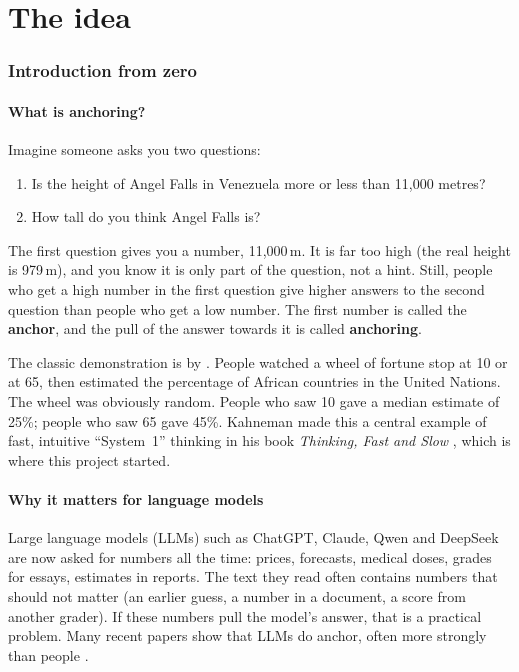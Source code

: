 \documentclass[11pt,a4paper]{article}
\begin{document}
\tableofcontents
\clearpage

\part{The idea}

\section{Introduction from zero}
\label{sec:intro}

\subsection{What is anchoring?}

Imagine someone asks you two questions:
\begin{enumerate}
  \item Is the height of Angel Falls in Venezuela more or less than 11,000 metres?
  \item How tall do you think Angel Falls is?
\end{enumerate}
The first question gives you a number, 11,000\,m. It is far too high (the real height is 979\,m), and you know it is only part of the question, not a hint. Still, people who get a high number in the first question give higher answers to the second question than people who get a low number. The first number is called the \textbf{anchor}, and the pull of the answer towards it is called \textbf{anchoring}.

The classic demonstration is by \citet{tversky1974judgment}. People watched a wheel of fortune stop at 10 or at 65, then estimated the percentage of African countries in the United Nations. The wheel was obviously random. People who saw 10 gave a median estimate of 25\%; people who saw 65 gave 45\%. Kahneman made this a central example of fast, intuitive ``System~1'' thinking in his book \emph{Thinking, Fast and Slow} \citep{kahneman2011thinking}, which is where this project started.

\subsection{Why it matters for language models}

Large language models (LLMs) such as ChatGPT, Claude, Qwen and DeepSeek are now asked for numbers all the time: prices, forecasts, medical doses, grades for essays, estimates in reports. The text they read often contains numbers that should not matter (an earlier guess, a number in a document, a score from another grader). If these numbers pull the model's answer, that is a practical problem. Many recent papers show that LLMs do anchor, often more strongly than people \citep{lou2026anchoring,huang2025understanding,borjigin2026anchorbench}.
\end{document}
